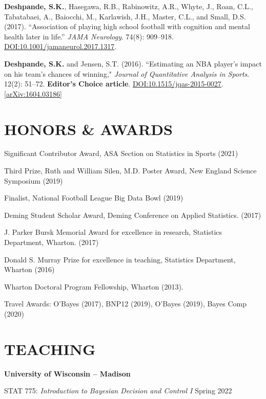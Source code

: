 \documentclass[margin]{res}
\begin{document}
\begin{resume}
\textbf{Deshpande, S.K.}, Hasegawa, R.B., Rabinowitz, A.R., Whyte, J., Roan, C.L., Tabatabaei, A., Baiocchi, M., Karlawish, J.H., Master, C.L., and Small, D.S. (2017). ``Association of playing high school football with cognition and mental health later in life.'' \textit{JAMA Neurology}. 74(8): 909--918. \href{https://doi.org/10.1001/jamaneurol.2017.1317}{DOI:10.1001/jamaneurol.2017.1317}.

\textbf{Deshpande, S.K.} and Jensen, S.T. (2016). ``Estimating an NBA player's impact on his team's chances of winning," \textit{Journal of Quantitative Analysis in Sports}. 12(2): 51--72. \textbf{Editor's Choice article}.  \href{https://doi.org/10.1515/jqas-2015-0027}{DOI:10.1515/jqas-2015-0027}.\href{https://arxiv.org/abs/1604.03186}{[arXiv:1604.03186]}


\section{HONORS \& AWARDS} 

Significant Contributor Award, ASA Section on Statistics in Sports (2021)

Third Prize, Ruth and William Silen, M.D. Poster Award, New England Science Symposium (2019)

Finalist, National Football League Big Data Bowl (2019)

Deming Student Scholar Award, Deming Conference on Applied Statistics. (2017)

J. Parker Bursk Memorial Award for excellence in research, Statistics Department, Wharton. (2017)

Donald S. Murray Prize for excellence in teaching, Statistics Department, Wharton (2016)

Wharton Doctoral Program Fellowship, Wharton (2013).

Travel Awards: O'Bayes (2017), BNP12 (2019), O'Bayes (2019), Bayes Comp (2020)

\section{TEACHING}

\textbf{University of Wisconsin -- Madison} 

STAT 775: {\it Introduction to Bayesian Decision and Control I} \hfill Spring 2022


\end{resume}
\end{document}
